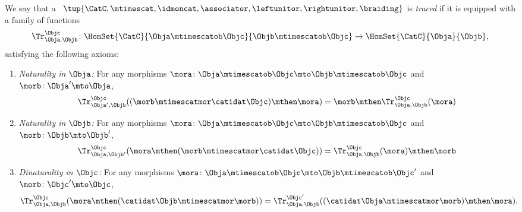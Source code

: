 \begin{ctdefinition}
    \label{def:traced-monoidal-cat}
    \label{def:traced-monoidal-category}
    We say that a ~$\tup{\CatC, \mtimescat, \idmoncat, \associator, \leftunitor, \rightunitor, \braiding}$ is \emph{traced} if it is equipped with a family of functions
    \begin{equation}
        \Tr_{\Obja,\Objb}^\Objc\colon \HomSet{\CatC}{\Obja \mtimescatob \Objc}{\Objb\mtimescatob \Objc}\to \HomSet{\CatC}{\Obja}{\Objb},
    \end{equation}
    satisfying the following axioms:
    \begin{enumerate}
        \item \emph{Naturality in $\Obja$:} For any morphisms $\mora\colon \Obja\mtimescatob \Objc \mto \Objb\mtimescatob \Objc$ and $\morb \colon \Obja' \mto \Obja$,
              \begin{equation}
                  \Tr_{\Obja', \Objb}^\Objc ( (\morb \mtimescatmor \catidat\Objc) \mthen \mora) = \morb \mthen \Tr_{\Obja, \Objb}^\Objc (\mora)
              \end{equation}
        \item \emph{Naturality in $\Objb$:} For any morphisms $\mora\colon \Obja\mtimescatob \Objc \mto \Objb\mtimescatob \Objc$ and $\morb \colon \Objb \mto \Objb'$,
              \begin{equation}
                  \Tr_{\Obja, \Objb'}^\Objc ( \mora \mthen (\morb \mtimescatmor \catidat\Objc) ) = \Tr_{\Obja, \Objb}^\Objc (\mora) \mthen \morb
              \end{equation}
        \item \emph{Dinaturality in $\Objc$:} For any morphisms $\mora \colon \Obja \mtimescatob \Objc \mto \Objb \mtimescatob \Objc'$ and $\morb \colon \Objc' \mto \Objc$,
              \begin{equation}
                  \Tr_{\Obja, \Objb}^{\Objc} (\mora \mthen (\catidat\Objb \mtimescatmor \morb)) = \Tr_{\Obja, \Objb}^{\Objc'}((\catidat\Obja \mtimescatmor \morb) \mthen \mora).
              \end{equation}


\end{enumerate}
\end{ctdefinition}

